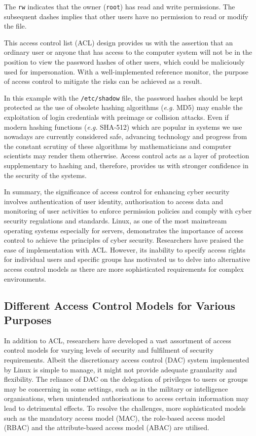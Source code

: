 \documentclass{article}
\begin{document}
The \texttt{rw} indicates that the owner (\texttt{root}) has read and write
permissions. The subsequent dashes implies that other users have no permission
to read or modify the file.

This access control list (ACL) design provides us with the assertion that
an ordinary user or anyone that has access to the computer system will not
be in the position to view the password hashes of other users, which could
be maliciously used for impersonation. With a well-implemented reference
monitor, the purpose of access control to mitigate the risks can be achieved
as a result.

In this example with the \texttt{/etc/shadow} file, the password hashes should
be kept protected as the use of obsolete hashing algorithms (\textit{e.g.} MD5)
may enable the exploitation of login credentials with preimage or collision
attacks. Even if modern hashing functions (\textit{e.g.} SHA-512) which are
popular in systems we use nowadays are currently considered safe, advancing
technology and progress from the constant scrutiny of these algorithms by
mathematicians and computer scientists may render them otherwise. Access
control acts as a layer of protection supplementary to hashing and, therefore,
provides us with stronger confidence in the security of the systems.

In summary, the significance of access control for enhancing cyber security
involves authentication of user identity, authorisation to access data and
monitoring of user activities to enforce permission policies and comply
with cyber security regulations and standards.\cite{principles} Linux,
as one of the most mainstream operating systems especially for servers,
demonstrates the importance of access control to achieve the principles of
cyber security. Researchers have praised the ease of implementation with
ACL. However, its inability to specify access rights for individual users
and specific groups\cite{access-control-assessment} has motivated us to
delve into alternative access control models as there are more sophisticated
requirements for complex environments.

\subsection{Different Access Control Models for Various Purposes}

In addition to ACL, researchers have developed a vast assortment of access
control models for varying levels of security and fulfilment of security
requirements. Albeit the discretionary access control (DAC) system implemented
by Linux is simple to manage, it might not provide adequate granularity and
flexibility. The reliance of DAC on the delegation of privileges to users
or groups may be concerning in some settings, such as in the military or
intelligence organisations, when unintended authorisations to access certain
information may lead to detrimental effects. To resolve the challenges, more
sophisticated models such as the mandatory access model (MAC), the role-based
access model (RBAC) and the attribute-based access model (ABAC) are utilised.
\end{document}
